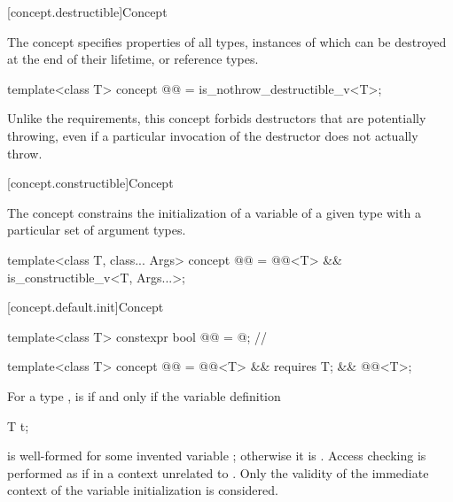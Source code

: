[concept.destructible]{Concept }

\pnum
The  concept specifies properties of all types,
instances of which can be destroyed at the end of their lifetime, or reference
types.

\begin{itemdecl}
template<class T>
  concept @@ = is_nothrow_destructible_v<T>;
\end{itemdecl}

\begin{itemdescr}
\pnum
\begin{note}
Unlike the  requirements, this
concept forbids destructors that are potentially throwing, even if a particular
invocation of the destructor does not actually throw.
\end{note}
\end{itemdescr}

[concept.constructible]{Concept }

\pnum
The  concept constrains the initialization of a
variable of a given type with a particular set of argument types.

\begin{itemdecl}
template<class T, class... Args>
  concept @@ = @@<T> && is_constructible_v<T, Args...>;
\end{itemdecl}

[concept.default.init]{Concept }

\begin{itemdecl}
template<class T>
  constexpr bool @@ = @\seebelow@;         // \expos

template<class T>
  concept @@ = @@<T> &&
                                  requires { T{}; } &&
                                  @@<T>;
\end{itemdecl}

\begin{itemdescr}
\pnum
For a type ,  is 
if and only if the variable definition
\begin{codeblock}
T t;
\end{codeblock}
is well-formed for some invented variable ;
otherwise it is .
Access checking is performed as if in a context unrelated to .
Only the validity of the immediate context of the variable initialization is considered.
\end{itemdescr}

